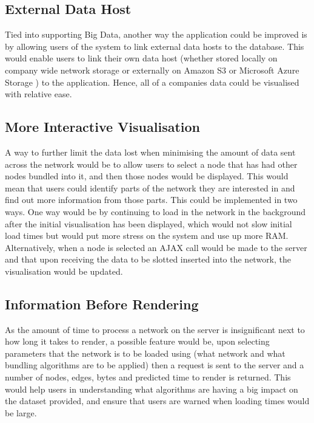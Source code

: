 \documentclass[../dissertation.tex]{subfiles}
\begin{document}
\subsection{External Data Host}

Tied into supporting Big Data, another way the application could be improved is by allowing users of the system to link external data hosts to the database. This would enable users to link their own data host (whether stored locally on company wide network storage or externally on Amazon S3 \cite{amazons3} or Microsoft Azure Storage \cite{msftazure}) to the application. Hence, all of a companies data could be visualised with relative ease.

\subsection{More Interactive Visualisation}

A way to further limit the data lost when minimising the amount of data sent across the network would be to allow users to select a node that has had other nodes bundled into it, and then those nodes would be displayed. This would mean that users could identify parts of the network they are interested in and find out more information from those parts. This could be implemented in two ways. One way would be by continuing to load in the network in the background after the initial visualisation has been displayed, which would not slow initial load times but would put more stress on the system and use up more RAM. Alternatively, when a node is selected an AJAX call would be made to the server and that upon receiving the data to be slotted inserted into the network, the visualisation would be updated.

\subsection{Information Before Rendering}

As the amount of time to process a network on the server is insignificant next to how long it takes to render, a possible feature would be, upon selecting parameters that the network is to be loaded using (what network and what bundling algorithms are to be applied) then a request is sent to the server and a number of nodes, edges, bytes and predicted time to render is returned. This would help users in understanding what algorithms are having a big impact on the dataset provided, and ensure that users are warned when loading times would be large.
\end{document}
